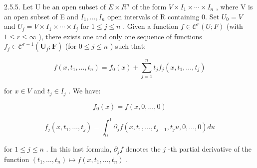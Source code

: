2.5.5. Let U be an open subset of \(E \times R^{n}\) of the form \(V \times I_{1} \times \cdots \times I_{n}\) , where V is an open subset of E and \(I_{1}, \ldots, I_{n}\) open intervals of R containing 0. Set \(U_{0} = V\) and \(U_{j} = V \times I_{1} \times \cdots \times I_{j}\) for \(1 \leqslant j \leqslant n\) . Given a function \(f \in \mathcal{C}^{r}(U; F)\) (with \(1 \leqslant r \leqslant \infty\) ), there exists one and only one sequence of functions \(f_{j}\in\mathcal{C}^{r-1}(\mathbf{U}_{j};\mathbf{F})\) (for \(0\leqslant j\leqslant n\) ) such that:

\[
f (x, t _ {1}, \dots , t _ {n}) = f _ {0} (x) + \sum_ {j = 1} ^ {n} t _ {j} f _ {j} (x, t _ {1}, \dots , t _ {j})
\]

for \(x \in V\) and \(t_j \in I_j\) . We have:

\[
f _ {0} (x) = f (x, 0, \dots , 0)
\]

\[
f _ {j} (x, t _ {1}, \dots , t _ {j}) = \int_ {0} ^ {1} \partial_ {j} f (x, t _ {1}, \dots , t _ {j - 1}, t _ {j} u, 0, \dots , 0) d u
\]

for \(1 \leqslant j \leqslant n\) . In this last formula, \(\partial_j f\) denotes the \(j\) -th partial derivative of the function \((t_1, \ldots, t_n) \mapsto f(x, t_1, \ldots, t_n)\) .

